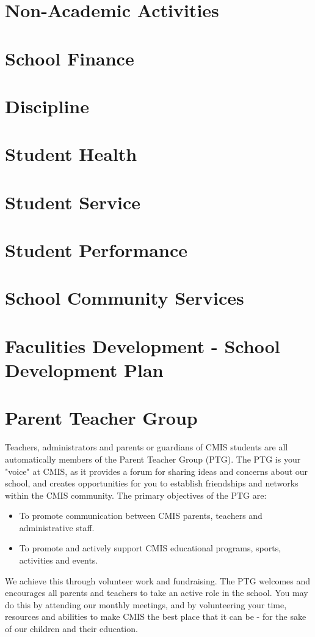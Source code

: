 \documentclass{report}
\begin{document}

\section{Non-Academic Activities}
\section{School Finance}
\section{Discipline}
\section{Student Health}
\section{Student Service}
\section{Student Performance}
\section{School Community Services}
\section{Faculities Development - School Development Plan}
\section{Parent Teacher Group}
Teachers, administrators and parents or guardians of CMIS students are all automatically members of the Parent Teacher Group (PTG). The PTG is your "voice" at CMIS, as it provides a forum for sharing ideas and concerns about our school, and creates opportunities for you to establish friendships and networks within the CMIS community. The primary objectives of the PTG are:
\begin{itemize}
\item To promote communication between CMIS parents, teachers and administrative staff.
\item To promote and actively support CMIS educational programs, sports, activities and events. 
\end{itemize}
We achieve this through volunteer work and fundraising.  The PTG welcomes and encourages all parents and teachers to take an active role in the school. You may do this by attending our monthly meetings, and by volunteering your time, resources and abilities to make CMIS the best place that it can be - for the sake of our children and their education.
\end{document}
